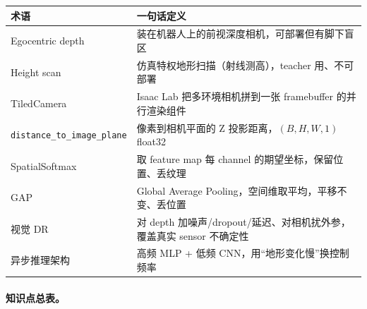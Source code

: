 \begin{center}
\small
\begin{tabular}{@{}ll@{}}
\toprule
术语 & 一句话定义 \\
\midrule
Egocentric depth & 装在机器人上的前视深度相机，可部署但有脚下盲区 \\
Height scan & 仿真特权地形扫描（射线测高），teacher 用、不可部署 \\
TiledCamera & Isaac Lab 把多环境相机拼到一张 framebuffer 的并行渲染组件 \\
\verb|distance_to_image_plane| & 像素到相机平面的 Z 投影距离，$(B,H,W,1)$ float32 \\
SpatialSoftmax & 取 feature map 每 channel 的期望坐标，保留位置、丢纹理 \\
GAP & Global Average Pooling，空间维取平均，平移不变、丢位置 \\
视觉 DR & 对 depth 加噪声/dropout/延迟、对相机扰外参，覆盖真实 sensor 不确定性 \\
异步推理架构 & 高频 MLP + 低频 CNN，用“地形变化慢”换控制频率 \\
\bottomrule
\end{tabular}
\end{center}

\paragraph{知识点总表。}


